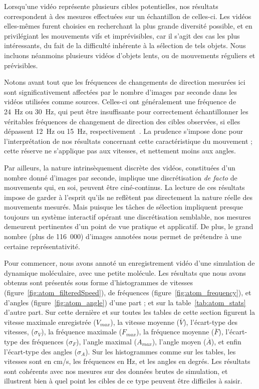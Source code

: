 	Lorsqu'une vidéo représente plusieurs cibles potentielles, nos résultats correspondent à des mesures effectuées sur un échantillon de celles-ci. Les vidéos elles-mêmes furent choisies en recherchant la plus grande diversité possible, et en privilégiant les mouvements vifs et imprévisibles, car il s'agit des cas les plus intéressants, du fait de la difficulté inhérente à la sélection de tels objets. Nous incluons néanmoins plusieurs vidéos d'objets lents, ou de mouvements réguliers et prévisibles.
	
	
	Notons avant tout que les fréquences de changements de direction mesurées ici sont significativement affectées par le nombre d'images par seconde dans les vidéos utilisées comme sources. Celles-ci ont généralement une fréquence de 24~Hz ou 30~Hz, qui peut être insuffisante pour correctement échantillonner les véritables fréquences de changement de direction des cibles observées, si elles dépassent 12~Hz ou 15~Hz, respectivement~\cite{shannon1949communication}. La prudence s'impose donc pour l'interprétation de nos résultats concernant cette caractéristique du mouvement ; cette réserve ne s'applique pas aux vitesses, et nettement moins aux angles.
	
	Par ailleurs, la nature intrinsèquement discrète des vidéos, constituées d'un nombre donné d'images par seconde, implique une discrétisation \emph{de facto} de mouvements qui, en soi, peuvent être ciné-continus. La lecture de ces résultats impose de garder à l'esprit qu'ils ne reflètent pas directement la nature réelle des mouvements mesurés. Mais puisque les tâches de sélection impliquent presque toujours un système interactif opérant une discrétisation semblable, nos mesures demeurent pertinentes d'un point de vue pratique et applicatif. De plus, le grand nombre (plus de 116~000) d'images annotées nous permet de prétendre à une certaine représentativité.
	
	Pour commencer, nous avons annoté un enregistrement vidéo d'une simulation de dynamique moléculaire, avec une petite molécule. Les résultats que nous avons obtenus sont présentés sous forme d'histogrammes de vitesses (figure~\ref{fig:atom_filteredSpeed}), de fréquences (figure~\ref{fig:atom_frequency}), et d'angles (figure~\ref{fig:atom_angle}) d'une part ; et sur la table~\ref{tab:atom_stats} d'autre part. Sur cette dernière et sur toutes les tables de cette section figurent la vitesse maximale enregistrée ($V_{max}$), la vitesse moyenne ($\overline{V}$), l'écart-type des vitesses, ($\sigma_{V}$), la fréquence maximale ($F_{max}$), la fréquence moyenne ($\overline{F}$), l'écart-type des fréquences ($\sigma_{F}$), l'angle maximal ($A_{max}$), l'angle moyen ($\overline{A}$), et enfin l'écart-type des angles ($\sigma_{A}$). Sur les histogrammes comme sur les tables, les vitesses sont en cm/s, les fréquences en Hz, et les angles en degrés. Les résultats sont cohérents avec nos mesures sur des données brutes de simulation, et illustrent bien à quel point les cibles de ce type peuvent être difficiles à saisir.
	
